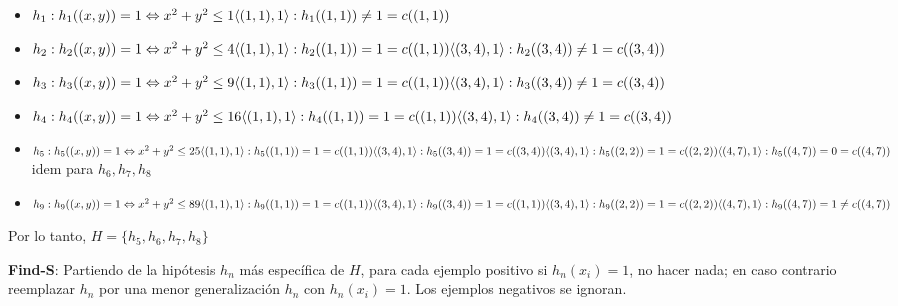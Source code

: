 \documentclass{article}
\begin{document}
\begin{itemize}
    \item \( h_1 : h_1 ((x, y)) = 1 \Leftrightarrow x^2 + y^2 \leq 1
    \\ \langle(1, 1), 1\rangle : h_1 ((1, 1)) \neq 1 = c((1, 1))\)
    \item \( h_2 : h_2 ((x, y)) = 1 \Leftrightarrow x^2 + y^2 \leq 4
    \\ \langle(1, 1), 1\rangle : h_2 ((1, 1)) = 1 = c((1, 1))
    \\ \langle(3, 4), 1\rangle : h_2 ((3, 4)) \neq 1 = c((3, 4))\)
    \item \( h_3 : h_3 ((x, y)) = 1 \Leftrightarrow x^2 + y^2 \leq 9
    \\ \langle(1, 1), 1\rangle : h_3 ((1, 1)) = 1 = c((1, 1))
    \\ \langle(3, 4), 1\rangle : h_3 ((3, 4)) \neq 1 = c((3, 4))\)
    \item \( h_4 : h_4 ((x, y)) = 1 \Leftrightarrow x^2 + y^2 \leq 16
    \\ \langle(1, 1), 1\rangle : h_4 ((1, 1)) = 1 = c((1, 1))
    \\ \langle(3, 4), 1\rangle : h_4 ((3, 4)) \neq 1 = c((3, 4))\)
    \item \( h_5 : h_5 ((x, y)) = 1 \Leftrightarrow x^2 + y^2 \leq 25
    \\ \langle(1, 1), 1\rangle : h_5 ((1, 1)) = 1 = c((1, 1))
    \\ \langle(3, 4), 1\rangle : h_5 ((3, 4)) = 1 = c((3, 4))
    \\ \langle(3, 4), 1\rangle : h_5 ((2, 2)) = 1 = c((2, 2))
    \\ \langle(4, 7), 1\rangle : h_5 ((4, 7)) = 0 = c((4, 7))\)
    \\ idem para \(h_6, h_7, h_8\)
    \item \( h_9 : h_9 ((x, y)) = 1 \Leftrightarrow x^2 + y^2 \leq 89
    \\ \langle(1, 1), 1\rangle : h_9 ((1, 1)) = 1 = c((1, 1))
    \\ \langle(3, 4), 1\rangle : h_9 ((3, 4)) = 1 = c((1, 1))
    \\ \langle(3, 4), 1\rangle : h_9 ((2, 2)) = 1 = c((2, 2))
    \\ \langle(4, 7), 1\rangle : h_9 ((4, 7)) = 1 \neq c((4, 7))\)
\end{itemize}
\begin{center}
Por lo tanto, \(H = \{h_5,h_6,h_7,h_8\}\)
\end{center}

\textbf{Find-S}: Partiendo de la hipótesis \(h_n\) más específica de \(H\), para cada ejemplo positivo si \(h_n (x_i) = 1\), no hacer nada; en caso contrario reemplazar \(h_n\) por una menor generalización \(h_n\) con \(h_n(x_i) = 1\). Los ejemplos negativos se ignoran.
\end{document}
